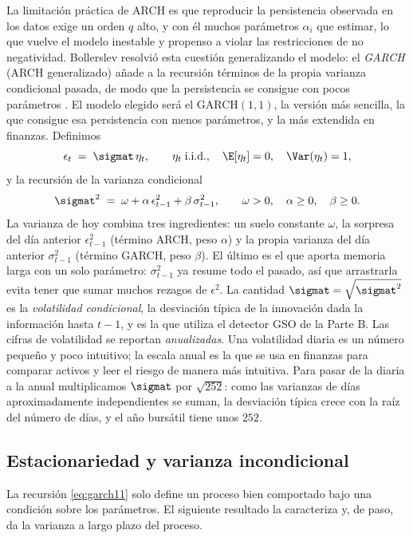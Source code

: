 La limitación práctica de ARCH es que reproducir la persistencia observada en los datos exige un orden $q$ alto, y con él muchos parámetros $\alpha_i$ que estimar, lo que vuelve el modelo inestable y propenso a violar las restricciones de no negatividad. Bollerslev resolvió esta cuestión generalizando el modelo: el \emph{GARCH} (ARCH generalizado) añade a la recursión términos de la propia varianza condicional pasada, de modo que la persistencia se consigue con pocos parámetros \cite{bollerslev1986}. El modelo elegido será el GARCH$(1,1)$, la versión más sencilla, la que consigue esa persistencia con menos parámetros, y la más extendida en finanzas. Definimos
\[
\epsilon_t \;=\; \sigmat\, \eta_t, \qquad \eta_t \;\text{i.i.d.}, \quad \E[\eta_t] = 0, \quad \Var(\eta_t) = 1,
\]
y la recursión de la varianza condicional
\begin{equation}
\label{eq:garch11}
\sigmat^2 \;=\; \omega + \alpha\, \epsilon_{t-1}^2 + \beta\, \sigma_{t-1}^2,
\qquad \omega > 0, \quad \alpha \ge 0, \quad \beta \ge 0.
\end{equation}
La varianza de hoy combina tres ingredientes: un suelo constante $\omega$, la sorpresa del día anterior $\epsilon_{t-1}^2$ (término ARCH, peso $\alpha$) y la propia varianza del día anterior $\sigma_{t-1}^2$ (término GARCH, peso $\beta$). El último es el que aporta memoria larga con un solo parámetro: $\sigma_{t-1}^2$ ya resume todo el pasado, así que arrastrarla evita tener que sumar muchos rezagos de $\epsilon^2$. La cantidad $\sigmat = \sqrt{\sigmat^2}$ es la \emph{volatilidad condicional}, la desviación típica de la innovación dada la información hasta $t-1$, y es la que utiliza el detector GSO de la Parte B. Las cifras de volatilidad se reportan \emph{anualizadas}. Una volatilidad diaria es un número pequeño y poco intuitivo; la escala anual es la que se usa en finanzas para comparar activos y leer el riesgo de manera más intuitiva. Para pasar de la diaria a la anual multiplicamos $\sigmat$ por $\sqrt{252}$: como las varianzas de días aproximadamente independientes se suman, la desviación típica crece con la raíz del número de días, y el año bursátil tiene unos $252$.

\subsection{Estacionariedad y varianza incondicional}
\label{sec:garch-estac}

La recursión \eqref{eq:garch11} solo define un proceso bien comportado bajo una condición sobre los parámetros. El siguiente resultado la caracteriza y, de paso, da la varianza a largo plazo del proceso.

